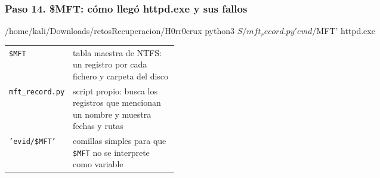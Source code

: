 \documentclass[11pt,a4paper]{article}
\begin{document}
\subsubsection*{Paso 14. \$MFT: cómo llegó httpd.exe y sus fallos}
\begin{comando}{/home/kali/Downloads/retosRecuperacion/H0rr0crux}
python3 $S/mft_record.py 'evid/$MFT' httpd.exe
\end{comando}
\begin{tcolorbox}[enhanced, breakable, colback=gray!3, colframe=gray!35, boxrule=0.3pt, arc=1pt, left=4pt, right=4pt, top=2pt, bottom=2pt, fonttitle=\sffamily\scriptsize\bfseries, coltitle=black!70, colbacktitle=gray!10, title={Qué hace cada parte}, attach title to upper, before skip=2pt, after skip=4pt, fontupper=\small]
\par{\renewcommand{\arraystretch}{1.12}\begin{tabularx}{\linewidth}{@{}>{\raggedright\arraybackslash}p{0.33\linewidth}>{\raggedright\arraybackslash}X@{}}
\texttt{\$MFT} & tabla maestra de NTFS: un registro por cada fichero y carpeta del disco \\
\texttt{mft\_\allowbreak{}record.py} & script propio: busca los registros que mencionan un nombre y muestra fechas y rutas \\
\texttt{'evid/\allowbreak{}\$MFT'} & comillas simples para que \texttt{\$MFT} no se interprete como variable \\
\end{tabularx}}
\end{tcolorbox}
\end{document}

